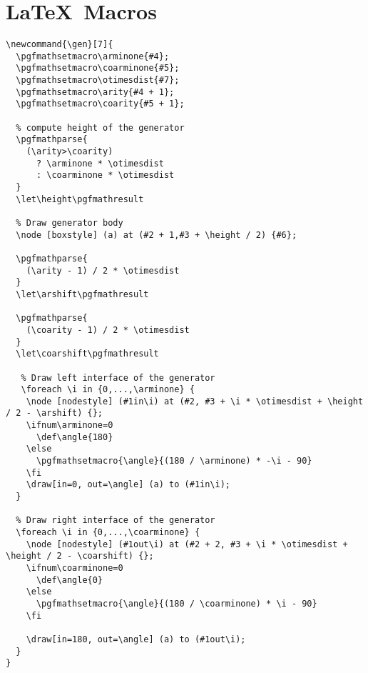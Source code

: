 \documentclass{article}
\begin{document}
\section{\LaTeX \, Macros}

\begin{lstlisting}[caption=\LaTeX \, macro for rendering generators., label={lst:gen}]
% fresh posx posy arity-1 coarity-1 name otimesdist
\newcommand{\gen}[7]{
  \pgfmathsetmacro\arminone{#4};
  \pgfmathsetmacro\coarminone{#5};
  \pgfmathsetmacro\otimesdist{#7};
  \pgfmathsetmacro\arity{#4 + 1};
  \pgfmathsetmacro\coarity{#5 + 1};

  % compute height of the generator
  \pgfmathparse{
    (\arity>\coarity)
      ? \arminone * \otimesdist
      : \coarminone * \otimesdist
  }
  \let\height\pgfmathresult

  % Draw generator body
  \node [boxstyle] (a) at (#2 + 1,#3 + \height / 2) {#6};

  \pgfmathparse{
    (\arity - 1) / 2 * \otimesdist
  }
  \let\arshift\pgfmathresult

  \pgfmathparse{
    (\coarity - 1) / 2 * \otimesdist
  }
  \let\coarshift\pgfmathresult

   % Draw left interface of the generator
   \foreach \i in {0,...,\arminone} {
    \node [nodestyle] (#1in\i) at (#2, #3 + \i * \otimesdist + \height / 2 - \arshift) {};
    \ifnum\arminone=0
      \def\angle{180}
    \else
      \pgfmathsetmacro{\angle}{(180 / \arminone) * -\i - 90}
    \fi
    \draw[in=0, out=\angle] (a) to (#1in\i);
  }

  % Draw right interface of the generator
  \foreach \i in {0,...,\coarminone} {
    \node [nodestyle] (#1out\i) at (#2 + 2, #3 + \i * \otimesdist + \height / 2 - \coarshift) {};
    \ifnum\coarminone=0
      \def\angle{0}
    \else
      \pgfmathsetmacro{\angle}{(180 / \coarminone) * \i - 90}
    \fi

    \draw[in=180, out=\angle] (a) to (#1out\i);
  }
}
\end{lstlisting}
\end{document}
